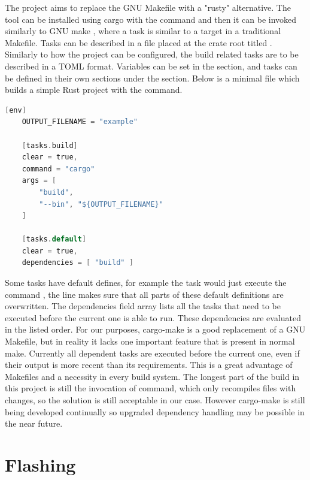 The  \cite{CargoMake} project aims to replace the GNU Makefile with a "rusty" alternative. The tool can be installed using cargo with the command  and then it can be invoked similarly to GNU make , where a task is similar to a target in a traditional Makefile. Tasks can be described in a file placed at the crate root titled . Similarly to how the project can be configured, the build related tasks are to be described in a TOML format. Variables can be set in the \mycode{[env]} section, and tasks can be defined in their own sections under the  section. Below is a minimal  file which builds a simple Rust project with the  command.

\begin{lstlisting}[language=C,frame=single,float=!ht,label={lst:cargo-task-example},caption={Cargo Make Task Example}]
    [env]
    OUTPUT_FILENAME = "example"

    [tasks.build]
    clear = true,
    command = "cargo"
    args = [
        "build",
        "--bin", "${OUTPUT_FILENAME}"
    ]

    [tasks.default]
    clear = true,
    dependencies = [ "build" ]
\end{lstlisting}

Some tasks have default defines, for example the  task would just execute the command , the  line makes sure that all parts of these default definitions are overwritten. The dependencies field array lists all the tasks that need to be executed before the current one is able to run. These dependencies are evaluated in the listed order. For our purposes, cargo-make is a good replacement of a GNU Makefile, but in reality it lacks one important feature that is present in normal make. Currently all dependent tasks are executed before the current one, even if their output is more recent than its requirements. This is a great advantage of Makefiles and a necessity in every build system. The longest part of the build in this project is still the invocation of  command, which only recompiles files with changes, so the solution is still acceptable in our case. However cargo-make is still being developed continually so upgraded dependency handling may be possible in the near future.

\section{Flashing}


